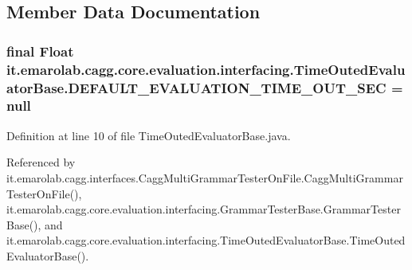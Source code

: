 \subsection{Member Data Documentation}
\hypertarget{classit_1_1emarolab_1_1cagg_1_1core_1_1evaluation_1_1interfacing_1_1TimeOutedEvaluatorBase_a37551d22b4de4b5c4759654d2a8b1e0a}{
\subsubsection[{D\-E\-F\-A\-U\-L\-T\-\_\-\-E\-V\-A\-L\-U\-A\-T\-I\-O\-N\-\_\-\-T\-I\-M\-E\-\_\-\-O\-U\-T\-\_\-\-S\-E\-C}]{\setlength{\rightskip}{0pt plus 5cm}final Float it.\-emarolab.\-cagg.\-core.\-evaluation.\-interfacing.\-Time\-Outed\-Evaluator\-Base.\-D\-E\-F\-A\-U\-L\-T\-\_\-\-E\-V\-A\-L\-U\-A\-T\-I\-O\-N\-\_\-\-T\-I\-M\-E\-\_\-\-O\-U\-T\-\_\-\-S\-E\-C = null\hspace{0.3cm}{\ttfamily [static]}}}\label{classit_1_1emarolab_1_1cagg_1_1core_1_1evaluation_1_1interfacing_1_1TimeOutedEvaluatorBase_a37551d22b4de4b5c4759654d2a8b1e0a}


Definition at line 10 of file Time\-Outed\-Evaluator\-Base.\-java.



Referenced by it.\-emarolab.\-cagg.\-interfaces.\-Cagg\-Multi\-Grammar\-Tester\-On\-File.\-Cagg\-Multi\-Grammar\-Tester\-On\-File(), it.\-emarolab.\-cagg.\-core.\-evaluation.\-interfacing.\-Grammar\-Tester\-Base.\-Grammar\-Tester\-Base(), and it.\-emarolab.\-cagg.\-core.\-evaluation.\-interfacing.\-Time\-Outed\-Evaluator\-Base.\-Time\-Outed\-Evaluator\-Base().

